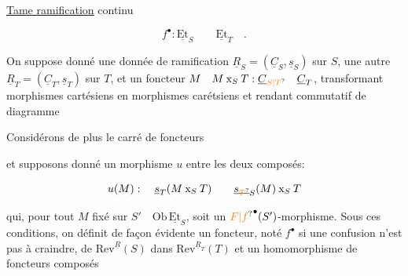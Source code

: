 \uline{Tame ramification}
continu

\[
f^\bullet:\underline{\mathrm{Et}}_S\qquad\underline{\mathrm{Et}}_T\quad .
\]

On suppose donné une donnée de ramification $\underline{R}_S=(\underline{C}_S,\underline{s}_S)$ sur $S$, une autre $\underline{R}_T=(\underline{C}_T,\underline{s}_T)$ sur $T$, et un foncteur  $M\quad M\mathbin{\mathrm{x}}_S T:\underline{C}_{\unsure{S|T}}\quad\underline{C}_T$, transformant morphismes cartésiens en morphismes carétsiens et rendant commutatif de diagramme


Considérons de plus le carré de foncteurs


et supposons donné un morphisme $u$ entre les deux composés:

\[
u(M):\quad\underline{s}_T(M\mathbin{\mathrm{x}}_S T)\qquad
\underline{s}_{\deleted{\unsure{T}}S}(M)\mathbin{\mathrm{x}}_S T
\]

qui, pour tout $M$ fixé sur $S'\quad\mathrm{Ob}\,\underline{\mathrm{Et}}_S$, soit un ${\unsure{F|f}}^{\bullet}(S')$-morphisme. Sous ces conditions, on définit de façon évidente un foncteur, noté $f^\bullet$  si une confusion n'est pas à craindre, de $\mathrm{Rev}^{\underline R}(S)$ dans $\mathrm{Rev}^{\underline R_T}(T)$ et un homomorphisme de foncteurs composés

